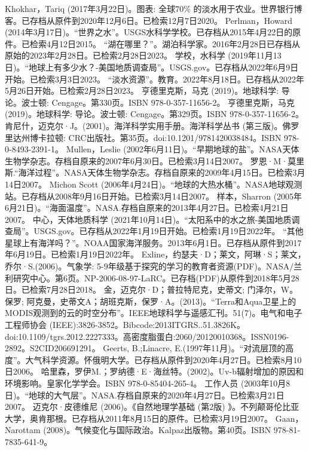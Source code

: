 \begin{enumerate}
 Khokhar，Tariq (2017年3月22日)。图表: 全球70\% 的淡水用于农业。世界银行博客。已存档从原件到2020年12月6日。已检索12月7日2020。
 Perlman，Howard (2014年3月17日)。“世界之水”。USGS水科学学校。已存档从2015年4月22日的原件。已检索4月12日2015。
 “湖在哪里？”。湖泊科学家。2016年2月28日已存档从原始的2023年2月28日。已检索2月28日2023。
 学校，水科学 (2019年11月13日)。“地球上有多少水？-美国地质调查局”。USGS.gov。已存档从2022年6月9日开始。已检索3月3日2023。
 “淡水资源”。教育。2022年8月18日。已存档从2022年5月26日开始。已检索2月28日2023。
 亨德里克斯，马克 (2019)。地球科学: 导论。波士顿: Cengage。第330页。ISBN 978-0-357-11656-2。
 亨德里克斯，马克 (2019)。地球科学: 导论。波士顿: Cengage。第329页。ISBN 978-0-357-11656-2。
 肯尼什，迈克尔·J。(2001)。海洋科学实用手册。海洋科学丛书 (第三版)。佛罗里达州博卡拉顿: CRC出版社。第35页。doi:10.1201/9781420038484。ISBN 978-0-8493-2391-1。
 Mullen，Leslie (2002年6月11日)。“早期地球的盐”。NASA天体生物学杂志。存档自原来的2007年6月30日。已检索3月14日2007。
 罗恩·M·莫里斯.“海洋过程”。NASA天体生物学杂志。存档自原来的2009年4月15日。已检索3月14日2007。
 Michon Scott (2006年4月24日)。“地球的大热水桶”。NASA地球观测站。已存档从2008年9月16日开始。已检索3月14日2007。
 样本，Sharron (2005年6月21日)。“海面温度”。NASA.存档自原来的2013年4月27日。已检索4月21日2007。
 中心，天体地质科学 (2021年10月14日)。“太阳系中的水之旅-美国地质调查局”。USGS.gov。已存档从2022年1月19日开始。已检索1月19日2022年。
 “其他星球上有海洋吗？”。NOAA国家海洋服务。2013年6月1日。已存档从原件到2017年6月19日。已检索1月19日2022年。
 Exline，约瑟夫·D；莱文，阿琳·S；莱文，乔尔·S.(2006)。气象学: 5-9年级基于探究的学习的教育者资源(PDF)。NASA/兰利研究中心。第6页。NP-2006-08-97-LaRC。已存档(PDF)从原件到2018年5月28日。已检索7月28日2018。
 金，迈克尔·D；普拉特尼克，史蒂文; 门泽尔，W。保罗; 阿克曼，史蒂文A；胡班克斯，保罗·A。(2013)。“Terra和Aqua卫星上的MODIS观测到的云的时空分布”。IEEE地球科学与遥感汇刊。51(7)。电气和电子工程师协会 (IEEE):3826-3852。Bibcode:2013ITGRS..51.3826K。doi:10.1109/tgrs.2012.2227333。高密度脂蛋白:2060/20120010368。ISSN0196-2892。S2CID206691291。  
 Geerts, B.;Linacre, E.(1997年11月)。“对流层顶的高度”。大气科学资源。怀俄明大学。已存档从原件到2020年4月27日。已检索8月10日2006。
 哈里森，罗伊M.；罗纳德·E·海丝特。(2002)。Uv-b辐射增加的原因和环境影响。皇家化学学会。ISBN 978-0-85404-265-4。
 工作人员 (2003年10月8日)。“地球的大气层”。NASA.存档自原来的2020年4月27日。已检索3月21日2007。
 迈克尔·皮德维尼 (2006)。《自然地理学基础 (第2版) 》。不列颠哥伦比亚大学，奥肯那根。已存档从2011年8月15日的原件。已检索3月19日2007。
 Gaan，Narottam (2008)。气候变化与国际政治。Kalpaz出版物。第40页。ISBN 978-81-7835-641-9。

\end{enumerate}
